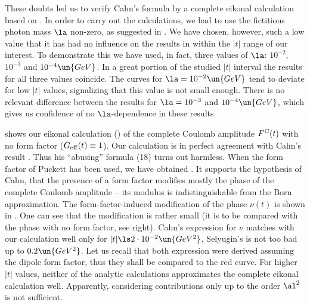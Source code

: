 These doubts led us to verify Cahn's formula by a complete eikonal calculation based on . In order to carry out the calculations, we had to use the fictitious photon mass $\la$ non-zero, as suggested in . We have chosen, however, such a low value that it has had no influence on the results in within the $|t|$ range of our interest. To demonstrate this we have used, in fact, three values of $\la$: $10^{-2}$, $10^{-3}$ and $10^{-4}\un{GeV}$. In a great portion of the studied $|t|$ interval the results for all three values coincide. The curves for $\la = 10^{-2} \un{GeV}$ tend to deviate for low $|t|$ values, signalizing that this value is not small enough. There is no relevant difference between the results for $\la = 10^{-3}$ and $10^{-4}\un{GeV}$, which gives us confidence of no $\la$-dependence in these results.


\bmfig
{}
%
\emfig

\eject
{} shows our eikonal calculation () of the complete Coulomb amplitude $F^{\rm C}(t)$ with no form factor ($G_{\rm eff}(t) \equiv 1$). Our calculation is in perfect agreement with Cahn's result . Thus his ``abusing'' formula (18) turns out harmless. When the form factor of Puckett has been used, we have obtained . It supports the hypothesis of Cahn, that the presence of a form factor modifies mostly the phase of the complete Coulomb amplitude -- its modulus is indistinguishable from the Born approximation. The form-factor-induced modification of the phase $\nu(t)$ is shown in . One can see that the modification is rather small (it is to be compared with the phase with no form factor, see  right). Cahn's expression for $\nu$ matches with our calculation well only for $|t| \ls 2\cdot 10^{-2}\un{GeV^2}$, Selyugin's is not too bad up to $0.2\un{GeV^2}$. Let us recall that both expression were derived assuming the dipole form factor, thus they shall be compared to the red curve. For higher $|t|$ values, neither of the analytic calculations approximates the complete eikonal calculation well. Apparently, considering contributions only up to the order $\al^2$ is not sufficient.

